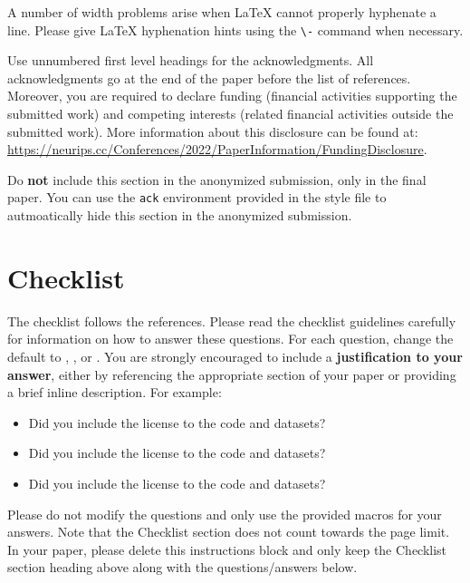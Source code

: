 \documentclass{article}
\begin{document}
A number of width problems arise when \LaTeX{} cannot properly hyphenate a
line. Please give LaTeX hyphenation hints using the \verb+\-+ command when
necessary.

\begin{ack}
      Use unnumbered first level headings for the acknowledgments. All acknowledgments
      go at the end of the paper before the list of references. Moreover, you are required to declare
      funding (financial activities supporting the submitted work) and competing interests (related financial activities outside the submitted work).
      More information about this disclosure can be found at: \url{https://neurips.cc/Conferences/2022/PaperInformation/FundingDisclosure}.

      Do {\bf not} include this section in the anonymized submission, only in the
      final paper. You can use the \texttt{ack} environment provided in the style
      file to autmoatically hide this section in the anonymized submission.
\end{ack}

\section*{Checklist}

The checklist follows the references. Please read the checklist guidelines
carefully for information on how to answer these questions. For each question,
change the default \answerTODO{} to \answerYes{}, \answerNo{}, or \answerNA{}.
You are strongly encouraged to include a {\bf justification to your answer},
either by referencing the appropriate section of your paper or providing a
brief inline description. For example:
\begin{itemize}
      \item Did you include the license to the code and datasets? 
      \item Did you include the license to the code and datasets? 
      \item Did you include the license to the code and datasets? \answerNA{}
\end{itemize}
Please do not modify the questions and only use the provided macros for your
answers.  Note that the Checklist section does not count towards the page
limit.  In your paper, please delete this instructions block and only keep the
Checklist section heading above along with the questions/answers below.
\end{document}
